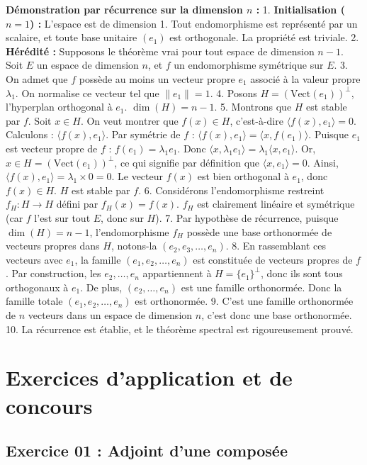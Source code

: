 \documentclass[11pt,a4paper]{article}
\begin{document}
\textbf{Démonstration par récurrence sur la dimension $n$ :}
1. \textbf{Initialisation ($n=1$) :} L'espace est de dimension 1. Tout endomorphisme est représenté par un scalaire, et toute base unitaire $(e_1)$ est orthogonale. La propriété est triviale.
2. \textbf{Hérédité :} Supposons le théorème vrai pour tout espace de dimension $n-1$. Soit $E$ un espace de dimension $n$, et $f$ un endomorphisme symétrique sur $E$.
3. On admet que $f$ possède au moins un vecteur propre $e_1$ associé à la valeur propre $\lambda_1$. On normalise ce vecteur tel que $\|e_1\| = 1$.
4. Posons $H = (\text{Vect}(e_1))^\perp$, l'hyperplan orthogonal à $e_1$. $\dim(H) = n - 1$.
5. Montrons que $H$ est stable par $f$.
   Soit $x \in H$. On veut montrer que $f(x) \in H$, c'est-à-dire $\langle f(x), e_1 \rangle = 0$.
   Calculons : $\langle f(x), e_1 \rangle$.
   Par symétrie de $f$ : $\langle f(x), e_1 \rangle = \langle x, f(e_1) \rangle$.
   Puisque $e_1$ est vecteur propre de $f$ : $f(e_1) = \lambda_1 e_1$.
   Donc $\langle x, \lambda_1 e_1 \rangle = \lambda_1 \langle x, e_1 \rangle$.
   Or, $x \in H = (\text{Vect}(e_1))^\perp$, ce qui signifie par définition que $\langle x, e_1 \rangle = 0$.
   Ainsi, $\langle f(x), e_1 \rangle = \lambda_1 \times 0 = 0$.
   Le vecteur $f(x)$ est bien orthogonal à $e_1$, donc $f(x) \in H$. $H$ est stable par $f$.
6. Considérons l'endomorphisme restreint $f_H : H \to H$ défini par $f_H(x) = f(x)$.
   $f_H$ est clairement linéaire et symétrique (car $f$ l'est sur tout $E$, donc sur $H$).
7. Par hypothèse de récurrence, puisque $\dim(H) = n-1$, l'endomorphisme $f_H$ possède une base orthonormée de vecteurs propres dans $H$, notons-la $(e_2, e_3, \dots, e_n)$.
8. En rassemblant ces vecteurs avec $e_1$, la famille $(e_1, e_2, \dots, e_n)$ est constituée de vecteurs propres de $f$.
   Par construction, les $e_2, \dots, e_n$ appartiennent à $H = \{e_1\}^\perp$, donc ils sont tous orthogonaux à $e_1$.
   De plus, $(e_2, \dots, e_n)$ est une famille orthonormée.
   Donc la famille totale $(e_1, e_2, \dots, e_n)$ est orthonormée.
9. C'est une famille orthonormée de $n$ vecteurs dans un espace de dimension $n$, c'est donc une base orthonormée.
10. La récurrence est établie, et le théorème spectral est rigoureusement prouvé.

\section{Exercices d'application et de concours}

\subsection*{Exercice 01 : Adjoint d'une composée}
\end{document}
